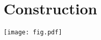 \documentclass[journal,10pt,twocolumn]{article}
\begin{document}
\section{ Construction}
\texttt{[image: fig.pdf]} 
\end{document}

